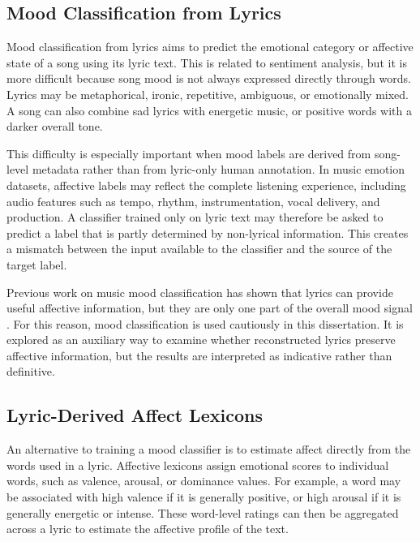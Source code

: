 \subsection{Mood Classification from Lyrics}

Mood classification from lyrics aims to predict the emotional category or affective state of a song using its lyric text. This is related to sentiment analysis, but it is more difficult because song mood is not always expressed directly through words. Lyrics may be metaphorical, ironic, repetitive, ambiguous, or emotionally mixed. A song can also combine sad lyrics with energetic music, or positive words with a darker overall tone.

This difficulty is especially important when mood labels are derived from song-level metadata rather than from lyric-only human annotation. In music emotion datasets, affective labels may reflect the complete listening experience, including audio features such as tempo, rhythm, instrumentation, vocal delivery, and production. A classifier trained only on lyric text may therefore be asked to predict a label that is partly determined by non-lyrical information. This creates a mismatch between the input available to the classifier and the source of the target label.

Previous work on music mood classification has shown that lyrics can provide useful affective information, but they are only one part of the overall mood signal \cite{laurier2008multimodal,hu2009lyric,delbouys2018musicmood}. For this reason, mood classification is used cautiously in this dissertation. It is explored as an auxiliary way to examine whether reconstructed lyrics preserve affective information, but the results are interpreted as indicative rather than definitive.

\subsection{Lyric-Derived Affect Lexicons}

An alternative to training a mood classifier is to estimate affect directly from the words used in a lyric. Affective lexicons assign emotional scores to individual words, such as valence, arousal, or dominance values. For example, a word may be associated with high valence if it is generally positive, or high arousal if it is generally energetic or intense. These word-level ratings can then be aggregated across a lyric to estimate the affective profile of the text.

